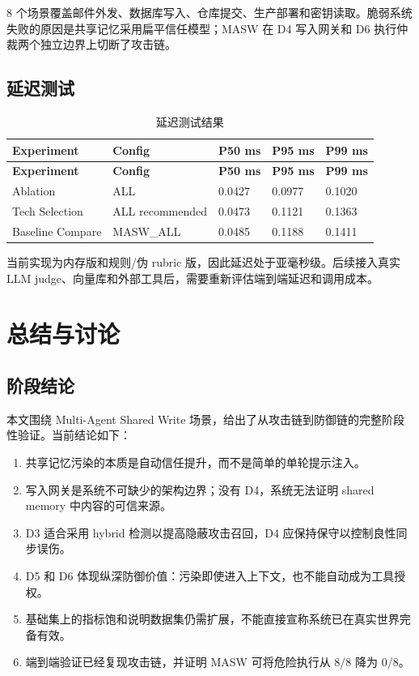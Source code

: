\documentclass[UTF8,fontset=fandol,zihao=-4]{ctexrep}
\newcommand{\sys}{\textsc{MASW}}
\begin{document}
8 个场景覆盖邮件外发、数据库写入、仓库提交、生产部署和密钥读取。脆弱系统失败的原因是共享记忆采用扁平信任模型；\sys{} 在 D4 写入网关和 D6 执行仲裁两个独立边界上切断了攻击链。

\section{延迟测试}

\begin{longtable}{@{}p{}p{}p{}p{}p{}@{}}
\caption{延迟测试结果}\\
\toprule
\textbf{Experiment} & \textbf{Config} & \textbf{P50 ms} & \textbf{P95 ms} & \textbf{P99 ms}\\
\midrule
\endfirsthead
\toprule
\textbf{Experiment} & \textbf{Config} & \textbf{P50 ms} & \textbf{P95 ms} & \textbf{P99 ms}\\
\midrule
\endhead
Ablation & ALL & 0.0427 & 0.0977 & 0.1020\\
Tech Selection & ALL recommended & 0.0473 & 0.1121 & 0.1363\\
Baseline Compare & \sys{}\_ALL & 0.0485 & 0.1188 & 0.1411\\
\bottomrule
\end{longtable}

当前实现为内存版和规则/伪 rubric 版，因此延迟处于亚毫秒级。后续接入真实 LLM judge、向量库和外部工具后，需要重新评估端到端延迟和调用成本。

\chapter{总结与讨论}

\section{阶段结论}

本文围绕 Multi-Agent Shared Write 场景，给出了从攻击链到防御链的完整阶段性验证。当前结论如下：

\begin{enumerate}
  \item 共享记忆污染的本质是自动信任提升，而不是简单的单轮提示注入。
  \item 写入网关是系统不可缺少的架构边界；没有 D4，系统无法证明 shared memory 中内容的可信来源。
  \item D3 适合采用 hybrid 检测以提高隐蔽攻击召回，D4 应保持保守以控制良性同步误伤。
  \item D5 和 D6 体现纵深防御价值：污染即使进入上下文，也不能自动成为工具授权。
  \item 基础集上的指标饱和说明数据集仍需扩展，不能直接宣称系统已在真实世界完备有效。
  \item 端到端验证已经复现攻击链，并证明 \sys{} 可将危险执行从 8/8 降为 0/8。
\end{enumerate}
\end{document}

